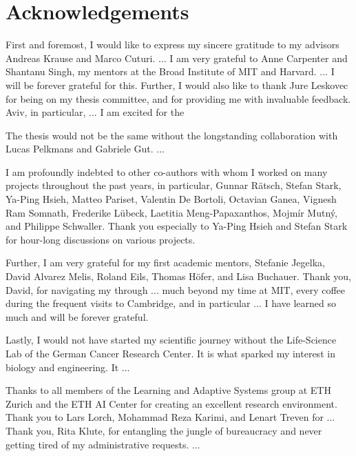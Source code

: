 
\bigskip

\begingroup
\let\clearpage\relax
\let\cleardoublepage\relax
\let\cleardoublepage\relax
\chapter*{Acknowledgements}

\def\thanks#1{%
\begingroup
\leftskip1em
\noindent #1
\par
\endgroup
}

First and foremost, I would like to express my sincere gratitude to my advisors Andreas Krause and Marco Cuturi.
...
I am very grateful to Anne Carpenter and Shantanu Singh, my mentors at the Broad Institute of MIT and Harvard. ... I will be forever grateful for this.
Further, I would also like to thank Jure Leskovec for being on my thesis committee, and for providing me with invaluable feedback. 
Aviv, in particular, ...
I am excited for the 

The thesis would not be the same without the longstanding collaboration with Lucas Pelkmans and Gabriele Gut. ...

I am profoundly indebted to other co-authors with whom I worked on many projects throughout the past years, in particular, Gunnar R\"atsch, Stefan Stark, Ya-Ping Hsieh,  Matteo Pariset, Valentin De Bortoli, Octavian Ganea, Vignesh Ram Somnath, Frederike L{\"u}beck, Laetitia Meng-Papaxanthos, Mojm{\'i}r Mutn{\'y}, and Philippe Schwaller. Thank you especially to Ya-Ping Hsieh and Stefan Stark for hour-long discussions on various projects. 

Further, I am very grateful for my first academic mentors, Stefanie Jegelka, David Alvarez Melis, Roland Eils, Thomas H\"ofer, and Lisa Buchauer.
Thank you, David, for navigating my through ... much beyond my time at MIT, every coffee during the frequent visits to Cambridge, and in particular ... I have learned so much and will be forever grateful.

Lastly, I would not have started my scientific journey without the Life-Science Lab of the German Cancer Research Center. It is what sparked my interest in biology and engineering. It ...

Thanks to all members of the Learning and Adaptive Systems group at ETH Zurich and the ETH AI Center for creating an excellent research environment. Thank you to Lars Lorch, Mohammad Reza Karimi, and Lenart Treven for ... 
Thank you, Rita Klute, for entangling the jungle of bureaucracy and never getting tired of my administrative requests. ...

